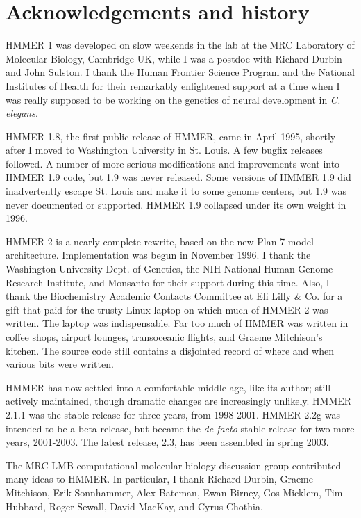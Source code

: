 \section{Acknowledgements and history}

HMMER 1 was developed on slow weekends in the lab at the MRC
Laboratory of Molecular Biology, Cambridge UK, while I was a postdoc
with Richard Durbin and John Sulston. I thank the Human Frontier
Science Program and the National Institutes of Health for their
remarkably enlightened support at a time when I was really supposed to
be working on the genetics of neural development in \emph{C. elegans}.

HMMER 1.8, the first public release of HMMER, came in April 1995,
shortly after I moved to Washington University in St. Louis. A few
bugfix releases followed. A number of more serious modifications and
improvements went into HMMER 1.9 code, but 1.9 was never
released. Some versions of HMMER 1.9 did inadvertently escape
St. Louis and make it to some genome centers, but 1.9 was never
documented or supported. HMMER 1.9 collapsed under its own weight in
1996.

HMMER 2 is a nearly complete rewrite, based on the new Plan 7 model
architecture. Implementation was begun in November 1996. I thank the
Washington University Dept. of Genetics, the NIH National Human Genome
Research Institute, and Monsanto for their support during this time.
Also, I thank the Biochemistry Academic Contacts Committee at Eli
Lilly \& Co. for a gift that paid for the trusty Linux laptop on which
much of HMMER 2 was written. The laptop was indispensable. Far too
much of HMMER was written in coffee shops, airport lounges,
transoceanic flights, and Graeme Mitchison's kitchen. The source code
still contains a disjointed record of where and when various bits were
written.

HMMER has now settled into a comfortable middle age, like its author;
still actively maintained, though dramatic changes are increasingly
unlikely. HMMER 2.1.1 was the stable release for three years, from
1998-2001.  HMMER 2.2g was intended to be a beta release, but became
the \emph{de facto} stable release for two more years, 2001-2003. The
latest release, 2.3, has been assembled in spring 2003.

The MRC-LMB computational molecular biology discussion group
contributed many ideas to HMMER. In particular, I thank Richard
Durbin, Graeme Mitchison, Erik Sonnhammer, Alex Bateman, Ewan Birney,
Gos Micklem, Tim Hubbard, Roger Sewall, David MacKay, and Cyrus
Chothia. 

